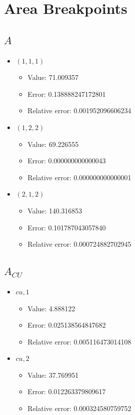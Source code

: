 \documentclass{article}%
\begin{document}
\section{Area Breakpoints}%
\thispagestyle{plain}%
\subsection{$A$}%
\begin{itemize}%
	\item $(1, 1, 1)$%
	\begin{itemize}%
		\item Value: 71.009357%
		\item Error: 0.138888247172801%
		\item Relative error: 0.001952096606234%
	\end{itemize}%
	\item $(1, 2, 2)$%
	\begin{itemize}%
		\item Value: 69.226555%
		\item Error: 0.000000000000043%
		\item Relative error: 0.000000000000001%
	\end{itemize}%
	\item $(2, 1, 2)$%
	\begin{itemize}%
		\item Value: 140.316853%
		\item Error: 0.101787043057840%
		\item Relative error: 0.000724882702945%
	\end{itemize}%
\end{itemize}%
\subsection{$A_{CU}$}%
\begin{itemize}%
	\item $\textit{cu},1$%
	\begin{itemize}%
		\item Value: 4.888122%
		\item Error: 0.025138564847682%
		\item Relative error: 0.005116473014108%
	\end{itemize}%
	\item $\textit{cu},2$%
	\begin{itemize}%
		\item Value: 37.769951%
		\item Error: 0.012263379809617%
		\item Relative error: 0.000324580759752%
	\end{itemize}%
\end{itemize}%
\end{document}

